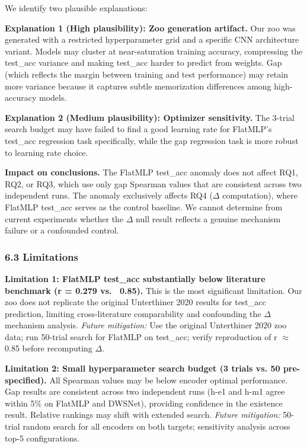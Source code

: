 We identify two plausible explanations:

\textbf{Explanation 1 (High plausibility): Zoo generation artifact.} Our zoo was generated with a restricted
hyperparameter grid and a specific CNN architecture variant. Models may cluster at near-saturation
training accuracy, compressing the test\_acc variance and making test\_acc harder to predict from weights.
Gap (which reflects the margin between training and test performance) may retain more variance because
it captures subtle memorization differences among high-accuracy models.

\textbf{Explanation 2 (Medium plausibility): Optimizer sensitivity.} The 3-trial search budget may have
failed to find a good learning rate for FlatMLP's test\_acc regression task specifically, while the
gap regression task is more robust to learning rate choice.

\textbf{Impact on conclusions.} The FlatMLP test\_acc anomaly does not affect RQ1, RQ2, or RQ3, which
use only gap Spearman values that are consistent across two independent runs. The anomaly exclusively
affects RQ4 ($\Delta$ computation), where FlatMLP test\_acc serves as the control baseline. We cannot
determine from current experiments whether the $\Delta$ null result reflects a genuine mechanism failure
or a confounded control.

\subsubsection{6.3 Limitations}

\textbf{Limitation 1: FlatMLP test\_acc substantially below literature benchmark (r = 0.279 vs. ~0.85).}
This is the most significant limitation. Our zoo does not replicate the original Unterthiner 2020
results for test\_acc prediction, limiting cross-literature comparability and confounding the $\Delta$
mechanism analysis.
\textit{Future mitigation:} Use the original Unterthiner 2020 zoo data; run 50-trial search for FlatMLP
on test\_acc; verify reproduction of r $\approx$ 0.85 before recomputing $\Delta$.

\textbf{Limitation 2: Small hyperparameter search budget (3 trials vs. 50 pre-specified).}
All Spearman values may be below encoder optimal performance. Gap results are consistent across
two independent runs (h-e1 and h-m1 agree within 5\% on FlatMLP and DWSNet), providing confidence
in the existence result. Relative rankings may shift with extended search.
\textit{Future mitigation:} 50-trial random search for all encoders on both targets; sensitivity analysis
across top-5 configurations.

